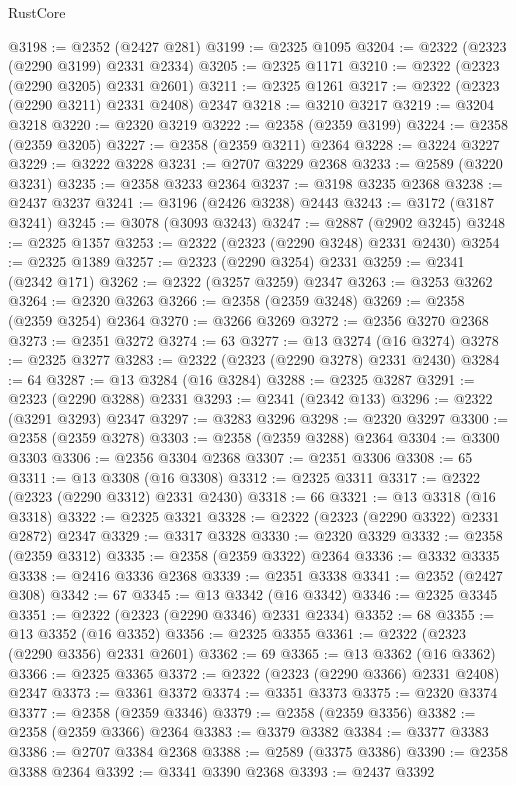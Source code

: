 \begin{lexlean}{RustCore}
\begin{coremodule}
@3198 := @2352 (@2427 @281)
@3199 := @2325 @1095
@3204 := @2322 (@2323 (@2290 @3199) @2331 @2334)
@3205 := @2325 @1171
@3210 := @2322 (@2323 (@2290 @3205) @2331 @2601)
@3211 := @2325 @1261
@3217 := @2322 (@2323 (@2290 @3211) @2331 @2408) @2347
@3218 := @3210 @3217
@3219 := @3204 @3218
@3220 := @2320 @3219
@3222 := @2358 (@2359 @3199)
@3224 := @2358 (@2359 @3205)
@3227 := @2358 (@2359 @3211) @2364
@3228 := @3224 @3227
@3229 := @3222 @3228
@3231 := @2707 @3229 @2368
@3233 := @2589 (@3220 @3231)
@3235 := @2358 @3233 @2364
@3237 := @3198 @3235 @2368
@3238 := @2437 @3237
@3241 := @3196 (@2426 @3238) @2443
@3243 := @3172 (@3187 @3241)
@3245 := @3078 (@3093 @3243)
@3247 := @2887 (@2902 @3245)
@3248 := @2325 @1357
@3253 := @2322 (@2323 (@2290 @3248) @2331 @2430)
@3254 := @2325 @1389
@3257 := @2323 (@2290 @3254) @2331
@3259 := @2341 (@2342 @171)
@3262 := @2322 (@3257 @3259) @2347
@3263 := @3253 @3262
@3264 := @2320 @3263
@3266 := @2358 (@2359 @3248)
@3269 := @2358 (@2359 @3254) @2364
@3270 := @3266 @3269
@3272 := @2356 @3270 @2368
@3273 := @2351 @3272
@3274 := 63
@3277 := @13 @3274 (@16 @3274)
@3278 := @2325 @3277
@3283 := @2322 (@2323 (@2290 @3278) @2331 @2430)
@3284 := 64
@3287 := @13 @3284 (@16 @3284)
@3288 := @2325 @3287
@3291 := @2323 (@2290 @3288) @2331
@3293 := @2341 (@2342 @133)
@3296 := @2322 (@3291 @3293) @2347
@3297 := @3283 @3296
@3298 := @2320 @3297
@3300 := @2358 (@2359 @3278)
@3303 := @2358 (@2359 @3288) @2364
@3304 := @3300 @3303
@3306 := @2356 @3304 @2368
@3307 := @2351 @3306
@3308 := 65
@3311 := @13 @3308 (@16 @3308)
@3312 := @2325 @3311
@3317 := @2322 (@2323 (@2290 @3312) @2331 @2430)
@3318 := 66
@3321 := @13 @3318 (@16 @3318)
@3322 := @2325 @3321
@3328 := @2322 (@2323 (@2290 @3322) @2331 @2872) @2347
@3329 := @3317 @3328
@3330 := @2320 @3329
@3332 := @2358 (@2359 @3312)
@3335 := @2358 (@2359 @3322) @2364
@3336 := @3332 @3335
@3338 := @2416 @3336 @2368
@3339 := @2351 @3338
@3341 := @2352 (@2427 @308)
@3342 := 67
@3345 := @13 @3342 (@16 @3342)
@3346 := @2325 @3345
@3351 := @2322 (@2323 (@2290 @3346) @2331 @2334)
@3352 := 68
@3355 := @13 @3352 (@16 @3352)
@3356 := @2325 @3355
@3361 := @2322 (@2323 (@2290 @3356) @2331 @2601)
@3362 := 69
@3365 := @13 @3362 (@16 @3362)
@3366 := @2325 @3365
@3372 := @2322 (@2323 (@2290 @3366) @2331 @2408) @2347
@3373 := @3361 @3372
@3374 := @3351 @3373
@3375 := @2320 @3374
@3377 := @2358 (@2359 @3346)
@3379 := @2358 (@2359 @3356)
@3382 := @2358 (@2359 @3366) @2364
@3383 := @3379 @3382
@3384 := @3377 @3383
@3386 := @2707 @3384 @2368
@3388 := @2589 (@3375 @3386)
@3390 := @2358 @3388 @2364
@3392 := @3341 @3390 @2368
@3393 := @2437 @3392

\end{coremodule}
\end{lexlean}
